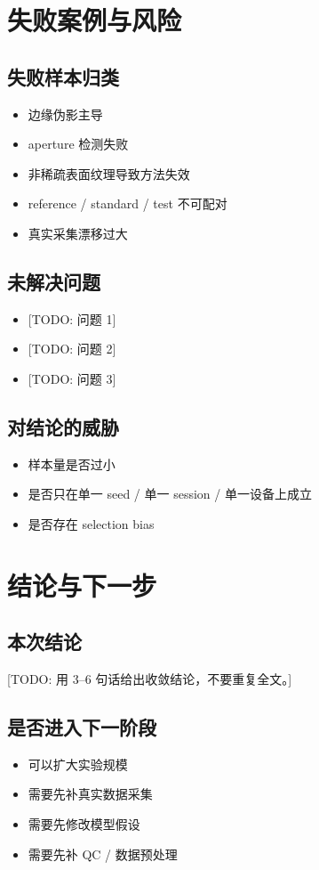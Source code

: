 \documentclass[UTF8,a4paper,11pt]{ctexart}
\newcommand{\TODO}[1]{\textcolor{red!70!black}{[TODO: #1]}}
\begin{document}
\section{失败案例与风险}

\subsection{失败样本归类}
\begin{itemize}
  \item 边缘伪影主导
  \item aperture 检测失败
  \item 非稀疏表面纹理导致方法失效
  \item reference / standard / test 不可配对
  \item 真实采集漂移过大
\end{itemize}

\subsection{未解决问题}
\begin{itemize}
  \item \TODO{问题 1}
  \item \TODO{问题 2}
  \item \TODO{问题 3}
\end{itemize}

\subsection{对结论的威胁}
\begin{itemize}
  \item 样本量是否过小
  \item 是否只在单一 seed / 单一 session / 单一设备上成立
  \item 是否存在 selection bias
\end{itemize}

\section{结论与下一步}

\subsection{本次结论}
\TODO{用 3--6 句话给出收敛结论，不要重复全文。}

\subsection{是否进入下一阶段}
\begin{itemize}
  \item [ ] 可以扩大实验规模
  \item [ ] 需要先补真实数据采集
  \item [ ] 需要先修改模型假设
  \item [ ] 需要先补 QC / 数据预处理
\end{itemize}
\end{document}
